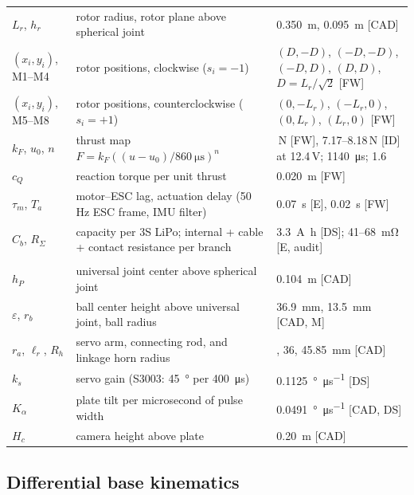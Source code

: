 \begin{small}
\begin{longtable}{@{}>{\raggedright\arraybackslash}p{}>{\raggedright\arraybackslash}p{}>{\raggedleft\arraybackslash}p{}@{}}
$L_r$, $h_r$ & rotor radius, rotor plane above spherical joint & \SI{0.350}{\metre}, \SI{0.095}{\metre} [CAD] \\
$(x_i,y_i)$, M1--M4 & rotor positions, clockwise ($s_i=-1$) & $(D,-D)$, $(-D,-D)$, $(-D,D)$, $(D,D)$, $D=L_r/\sqrt2$ [FW] \\
$(x_i,y_i)$, M5--M8 & rotor positions, counterclockwise ($s_i=+1$) & $(0,-L_r)$, $(-L_r,0)$, $(0,L_r)$, $(L_r,0)$ [FW] \\
$k_F$, $u_0$, $n$ & thrust map $F=k_F((u-u_0)/\SI{860}{\micro\second})^n$ & 5.40\,N [FW], 7.17--8.18\,N [ID] at 12.4\,V; \SI{1140}{\micro\second}; 1.6 \\
$c_Q$ & reaction torque per unit thrust & \SI{0.020}{\metre} [FW] \\
$\tau_m$, $T_a$ & motor--ESC lag, actuation delay (50\,Hz ESC frame, IMU filter) & \SI{0.07}{\second} [E], \SI{0.02}{\second} [FW] \\
$C_b$, $R_\Sigma$ & capacity per 3S LiPo; internal + cable + contact resistance per branch & \SI{3.3}{\ampere\hour} [DS]; 41--\SI{68}{\milli\ohm} [E, audit] \\
\midrule
\multicolumn{3}{@{}l}{\emph{Ball and plate}}\\
$h_P$ & universal joint center above spherical joint & \SI{0.104}{\metre} [CAD] \\
$\varepsilon$, $r_b$ & ball center height above universal joint, ball radius & \SI{36.9}{\milli\metre}, \SI{13.5}{\milli\metre} [CAD, M] \\
$r_a$, $\ell_r$, $R_h$ & servo arm, connecting rod, and linkage horn radius & 20, 36, \SI{45.85}{\milli\metre} [CAD] \\
$k_s$ & servo gain (S3003: \SI{45}{\degree} per \SI{400}{\micro\second}) & \SI{0.1125}{\degree\per\micro\second} [DS] \cite{futaba_s3003} \\
$K_\alpha$ & plate tilt per microsecond of pulse width & \SI{0.0491}{\degree\per\micro\second} [CAD, DS] \\
$H_c$ & camera height above plate & \SI{0.20}{\metre} [CAD] \\
\bottomrule
\end{longtable}
\end{small}

\subsection{Differential base kinematics}
\label{sec:basekin}

